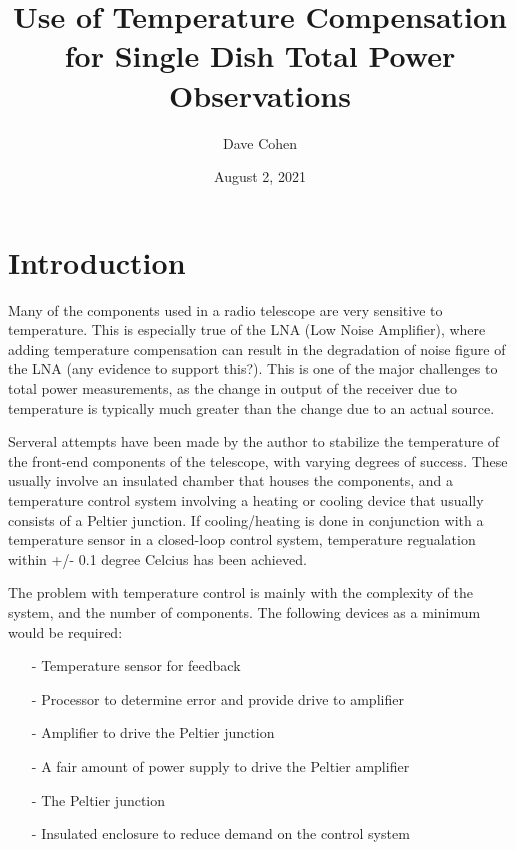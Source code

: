 \documentclass[letterpaper, 12pt]{article}
\begin{document}
\title{Use of Temperature Compensation for Single Dish Total Power Observations}
\author{Dave Cohen}
\date{August 2, 2021}
\maketitle

\tableofcontents
\newpage
{}

\section{Introduction}
Many of the components used in a radio telescope are very sensitive to temperature. This is especially true of the LNA (Low Noise Amplifier), where adding temperature compensation can result in the degradation of noise figure of the LNA {\color{red}(any evidence to support this?)}. This is one of the major challenges to total power measurements, as the change in output of the receiver due to temperature is typically much greater than the change due to an actual source.

Serveral attempts have been made by the author to stabilize the temperature of the front-end components of the telescope, with varying degrees of success. These usually involve an insulated chamber that houses the components, and a temperature control system involving a heating or cooling device that usually consists of a Peltier junction. If cooling/heating is done in conjunction with a temperature sensor in a closed-loop control system, temperature regualation within +/- 0.1 degree Celcius has been achieved.

The problem with temperature control is mainly with the complexity of the system, and the number of components. The following devices as a minimum would be required:

\begin{itemize}
	\item[-] Temperature sensor for feedback
	\item[-] Processor to determine error and provide drive to amplifier
	\item[-] Amplifier to drive the Peltier junction
	\item[-] A fair amount of power supply to drive the Peltier amplifier
	\item[-] The Peltier junction
	\item[-] Insulated enclosure to reduce demand on the control system
\end{itemize}
\end{document}

